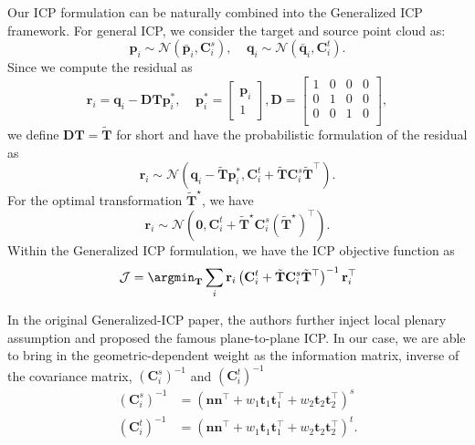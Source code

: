 Our ICP formulation can be naturally combined into the Generalized ICP~\citep{segal2009generalized} framework. For general ICP, we consider the target and source point cloud as: 
\begin{equation}
    \mathbf{p}_i \sim \mathcal{N}(\bar{\mathbf{p}}_i, \mathbf{C}_i^{s}), ~~~~~\mathbf{q}_i \sim \mathcal{N}(\bar{\mathbf{q}}_i, \mathbf{C}_i^{t}).
\end{equation}
Since we compute the residual as 
\begin{equation}
    \mathbf{r}_i = \mathbf{q}_i - \mathbf{D}\mathbf{T}\mathbf{p}_i^{*}, ~~~~~\mathbf{p}_i^{*} = \begin{bmatrix}
        \mathbf{p}_i \\
        1
    \end{bmatrix}, \mathbf{D} = \begin{bmatrix}
        1 &0 &0 & 0 \\
        0 &1 &0 & 0 \\
        0 &0 &1 & 0 \\
    \end{bmatrix},
\end{equation}
we define $\mathbf{D}\mathbf{T} = \tilde{\mathbf{T}}$ for short and have the probabilistic formulation of the residual as 
\begin{equation}
    \mathbf{r}_i \sim \mathcal{N} (\mathbf{q}_i - \tilde{\mathbf{T}}\mathbf{p}_i^{*}, \mathbf{C}_i^{t} + \tilde{\mathbf{T}}\mathbf{C}_i^{s} \tilde{\mathbf{T}}^{\top}).
\end{equation}
For the optimal transformation $\tilde{\mathbf{T}}^{\star}$, we have 
\begin{equation}
    \mathbf{r}_i \sim \mathcal{N} (\mathbf{0}, \mathbf{C}_i^{t} + \tilde{\mathbf{T}}^{\star}\mathbf{C}_i^{s} (\tilde{\mathbf{T}}^{\star})^{\top}).
\end{equation}
Within the Generalized ICP formulation, we have the ICP objective function as 
\begin{equation}
    \mathcal{J} = \argmin_{\mathbf{T}} \sum_{i} \mathbf{r}_i \left(\mathbf{C}_i^{t} + \tilde{\mathbf{T}}\mathbf{C}_i^{s} \tilde{\mathbf{T}}^{\top}\right)^{-1}\mathbf{r}_i^{\top}
\end{equation}

In the original Generalized-ICP paper, the authors further inject local plenary assumption and proposed the famous plane-to-plane ICP. In our case, we are able to bring in the geometric-dependent weight as the information matrix, inverse of the covariance matrix, $\left(\mathbf{C}_i^{s}\right)^{-1}$ and $\left(\mathbf{C}_i^{t}\right)^{-1}$
\begin{equation}
    \begin{split}
        \left(\mathbf{C}_i^{s}\right)^{-1} & =  (\mathbf{n}\mathbf{n}^\top + w_1\mathbf{t}_1\mathbf{t}_1^\top + w_2\mathbf{t}_2\mathbf{t}_2^\top)^{s}\\
        \left(\mathbf{C}_i^{t}\right)^{-1} & = (\mathbf{n}\mathbf{n}^\top + w_1\mathbf{t}_1\mathbf{t}_1^\top + w_2\mathbf{t}_2\mathbf{t}_2^\top)^{t}.
    \end{split}
\end{equation}

